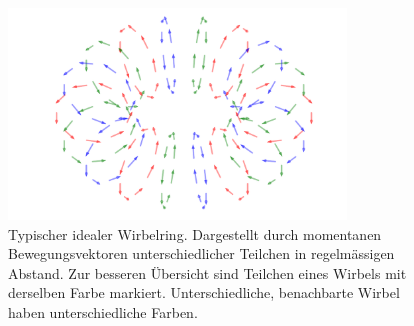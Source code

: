 \begin{figure}
\centering
\includegraphics[width=0.8\textwidth]{papers/wirbelringe/fig/wirbelring_RGB.pdf}
\caption{Typischer idealer Wirbelring. 
Dargestellt durch momentanen Bewegungsvektoren unterschiedlicher Teilchen in regelmässigen Abstand. 
Zur besseren Übersicht sind Teilchen eines Wirbels mit derselben Farbe markiert. 
Unterschiedliche, benachbarte Wirbel haben unterschiedliche Farben. \label{Wirbelringe:fig:generell}}
\end{figure}